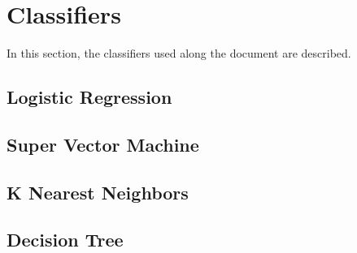 \section{Classifiers}
In this section, the classifiers used along the document are described.\\

\subsection{Logistic Regression}

\subsection{Super Vector Machine}

\subsection{K Nearest Neighbors}

\subsection{Decision Tree}
